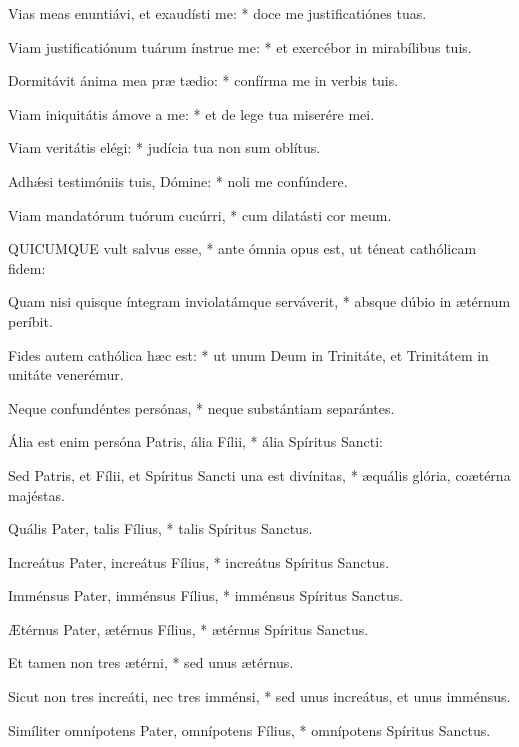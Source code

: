 Vias meas enuntiávi, et exaudísti me: * doce me justificatiónes tuas.

Viam justificatiónum tuárum ínstrue me: * et exercébor in mirabílibus tuis.

Dormitávit ánima mea præ tædio: * confírma me in verbis tuis.

Viam iniquitátis ámove a me: * et de lege tua miserére mei.

Viam veritátis elégi: * judícia tua non sum oblítus.

Adhǽsi testimóniis tuis, Dómine: * noli me confúndere.

Viam mandatórum tuórum cucúrri, * cum dilatásti cor meum.




QUICUMQUE vult salvus esse, * ante ómnia opus est, ut téneat cathólicam fidem:

Quam nisi quisque íntegram inviolatámque serváverit, * absque dúbio in ætérnum períbit.

Fides autem cathólica hæc est: * ut unum Deum in Trinitáte, et Trinitátem in unitáte venerémur.

Neque confundéntes persónas, * neque substántiam separántes.

Ália est enim persóna Patris, ália Fílii, * ália Spíritus Sancti:

Sed Patris, et Fílii, et Spíritus Sancti una est divínitas, * æquális glória, coætérna majéstas.

Quális Pater, talis Fílius, * talis Spíritus Sanctus.

Increátus Pater, increátus Fílius, * increátus Spíritus Sanctus.

Imménsus Pater, imménsus Fílius, * imménsus Spíritus Sanctus.

Ætérnus Pater, ætérnus Fílius, * ætérnus Spíritus Sanctus.

Et tamen non tres ætérni, * sed unus ætérnus.

Sicut non tres increáti, nec tres imménsi, * sed unus increátus, et unus imménsus.

Simíliter omnípotens Pater, omnípotens Fílius, * omnípotens Spíritus Sanctus.

